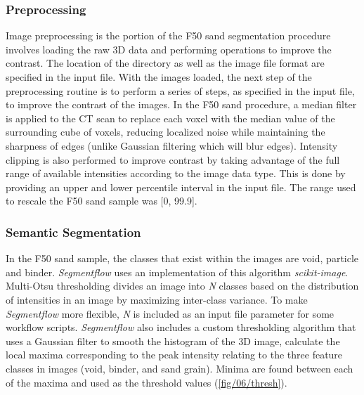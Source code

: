 \subsubsection{Preprocessing}
Image preprocessing is the portion of the F50 sand segmentation procedure
involves loading the raw 3D data and performing operations to improve the
contrast. The location of the directory as well as
the image file format are specified in the input file.
With the images loaded, the
next step of the preprocessing routine is to perform a series of steps, as
specified in the input file, to improve the contrast of the images. In the
F50 sand procedure, a median filter is applied to the CT scan
to replace each voxel with the median value of the surrounding cube
of voxels, reducing localized noise while maintaining the sharpness of
edges (unlike Gaussian filtering which will blur edges).
Intensity clipping is also performed to improve contrast by taking advantage
of the full range of available intensities according to the image data type.
This is done by providing an upper and lower percentile interval in the
input file. The range used to rescale the F50 sand sample was [0, 99.9].

\subsubsection{Semantic Segmentation}
In the F50 sand sample, the classes that exist within the images are
void, particle and binder.
\textit{Segmentflow}
uses an implementation of this algorithm \textit{scikit-image}.
Multi-Otsu thresholding divides an
image into \textit{N} classes based on the distribution of intensities in
an image by maximizing inter-class variance. To make \textit{Segmentflow}
more flexible, \textit{N} is included as an
input file parameter for some workflow scripts.
\textit{Segmentflow} also includes a custom thresholding algorithm that
uses a Gaussian filter to smooth the histogram of the 3D image, calculate the
local maxima corresponding to the peak intensity relating to the three
feature classes in images (void, binder, and sand grain). Minima are found
between each of the maxima and used as the threshold values
(\ref{fig/06/thresh}).

